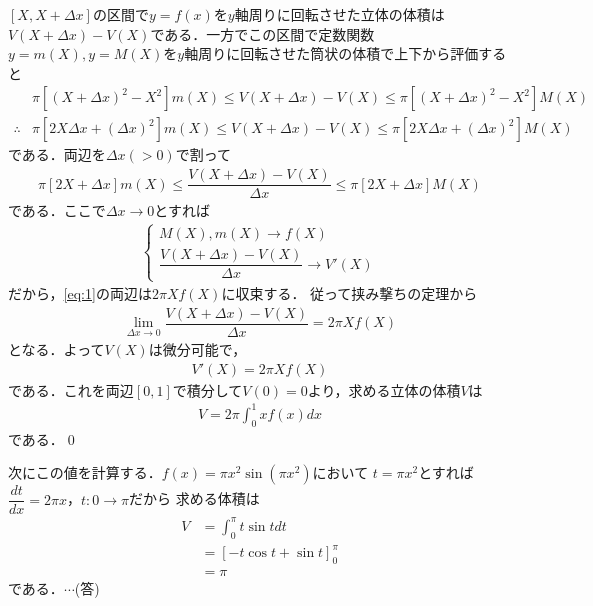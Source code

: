 \documentclass[../../main.tex]{subfiles}
\begin{document}
$[X,X+\Delta x]$の区間で$y=f(x)$を$y$軸周りに回転させた立体の体積は$V(X+\Delta x)-V(X)$である．一方でこの区間で定数関数$y=m(X), y=M(X)$を$y$軸周りに回転させた筒状の体積で上下から評価すると
\begin{align}
  & \pi\left[(X+\Delta x)^2-X^2\right] m(X)
  \le V(X+\Delta x)-V(X) \le
  \pi\left[(X+\Delta x)^2-X^2\right] M(X) \\
  \therefore
  & \pi\left[2X\Delta x +(\Delta x)^2\right] m(X)
  \le V(X+\Delta x)-V(X) \le
  \pi\left[2X\Delta x +(\Delta x)^2\right] M(X)
\end{align}
である．両辺を$\Delta x (>0)$で割って
\begin{align}
  \pi\left[2X + \Delta x\right] m(X) \le \dfrac{V(X+\Delta x)-V(X)}{\Delta x}
  \le \pi\left[2X + \Delta x\right] M(X) \label{eq:1}
\end{align}
である．ここで$\Delta x\to0$とすれば
\begin{align}
  \begin{cases}
    M(X),m(X) \to f(X) \\
    \dfrac{V(X+\Delta x)-V(X)}{\Delta x}\to V'(X)
  \end{cases}
\end{align}
だから，\cref{eq:1}の両辺は$2\pi Xf(X)$に収束する．
従って挟み撃ちの定理から
\begin{align}
  \lim_{\Delta x\to 0} \dfrac{V(X+\Delta x)-V(X)}{\Delta x}=2\pi Xf(X)
\end{align}
となる．よって$V(X)$は微分可能で，
\begin{align}
  V'(X) = 2\pi Xf(X)
\end{align}
である．これを両辺$[0,1]$で積分して$V(0)=0$より，求める立体の体積$V$は
\begin{align}
  V = 2\pi\int_0^1xf(x)dx
\end{align}
である．\qed

次にこの値を計算する．$f(x)=\pi x^2\sin(\pi x^2)$において
$t=\pi x^2$とすれば$\dfrac{dt}{dx}=2\pi x$，$t:0\to\pi$だから
求める体積は
\begin{align}
  V&=\int_0^\pi t\sin tdt \\
  &=\left[-t\cos t+\sin t\right]_0^\pi \\
  &=\pi
\end{align}
である．$\cdots$(答)

\newpage
\end{document}
